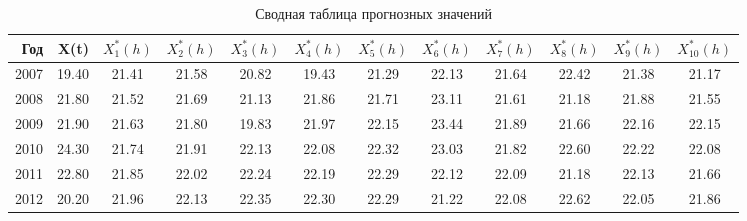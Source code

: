 \begin{table}[ht]
\centering
{\footnotesize
\begin{tabular}{r|rcccccccccc}
  \hline
Год & X(t) & $ X^{*}_1(h) $ & $ X^{*}_2(h) $ & $ X^{*}_3(h) $ & $ X^{*}_4(h) $ & $ X^{*}_5(h) $ & $ X^{*}_6(h) $ & $ X^{*}_7(h) $ & $ X^{*}_8(h) $ & $ X^{*}_9(h) $ & $ X^{*}_{10}(h) $ \\ 
  \hline
2007 & 19.40 & 21.41 & 21.58 & 20.82 & 19.43 & 21.29 & 22.13 & 21.64 & 22.42 & 21.38 & 21.17 \\ 
  2008 & 21.80 & 21.52 & 21.69 & 21.13 & 21.86 & 21.71 & 23.11 & 21.61 & 21.18 & 21.88 & 21.55 \\ 
  2009 & 21.90 & 21.63 & 21.80 & 19.83 & 21.97 & 22.15 & 23.44 & 21.89 & 21.66 & 22.16 & 22.15 \\ 
  2010 & 24.30 & 21.74 & 21.91 & 22.13 & 22.08 & 22.32 & 23.03 & 21.82 & 22.60 & 22.22 & 22.08 \\ 
  2011 & 22.80 & 21.85 & 22.02 & 22.24 & 22.19 & 22.29 & 22.12 & 22.09 & 21.18 & 22.13 & 21.66 \\ 
  2012 & 20.20 & 21.96 & 22.13 & 22.35 & 22.30 & 22.29 & 21.22 & 22.08 & 22.62 & 22.05 & 21.86 \\ 
   \hline
\end{tabular}
}
\caption{Сводная таблица прогнозных значений} 
\label{table:summary-prediction}
\end{table}
